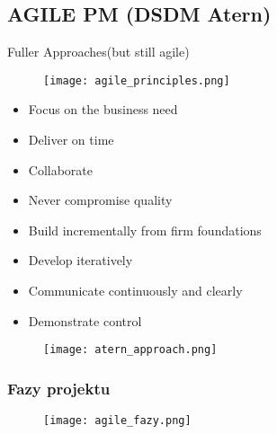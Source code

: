 \documentclass[a4paper]{article}
\begin{document}
\subsection{AGILE PM (DSDM Atern)}
Fuller Approaches(but still agile)

\begin{figure}[!h]
    \texttt{[image: agile\_principles.png]}
\end{figure}

\begin{itemize}
    \item Focus on the business need
    \item Deliver on time
    \item Collaborate
    \item Never compromise quality
    \item Build incrementally from firm foundations
    \item Develop iteratively
    \item Communicate continuously and clearly
    \item Demonstrate control
\end{itemize}

\begin{figure}[!h]
    \texttt{[image: atern\_approach.png]}
\end{figure}

\subsubsection{Fazy projektu}
\begin{figure}[!h]
    \texttt{[image: agile\_fazy.png]}
\end{figure}
\end{document}

